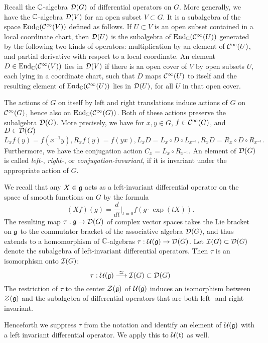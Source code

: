\documentclass{article}
\theoremstyle{definition}
\numberwithin{equation}{section}
\renewcommand{\-}{\hyp{}}
\newcommand{\g}{\mathfrak g}
\begin{document}
Recall the $\mathbb{C}$-algebra $\mathcal{D}(G)$ of differential operators on $G$. More generally, we have the $\mathbb{C}$-algebra $\mathcal{D}(V)$ for an open subset $V \subset G$. It is a subalgebra of the space $\textrm{End}_{\mathbb{C}}(\mathcal{C}^\infty(V))$ defined as follows. If $U \subset V$ is an open subset contained in a local coordinate chart, then $\mathcal{D}(U)$ is the subalgebra of $\textrm{End}_{\mathbb{C}}(\mathcal{C}^\infty(U))$ generated by the following two kinds of operators: multiplication by an element of $\mathcal{C}^\infty(U)$, and partial derivative with respect to a local coordinate. An element $D \in \textrm{End}_{\mathbb{C}}(\mathcal{C}^\infty(V))$ lies in $\mathcal{D}(V)$ if there is an open cover of $V$ by open subsets $U$, each lying in a coordinate chart, such that $D$ maps $\mathcal{C}^\infty(U)$ to itself and the resulting element of $\textrm{End}_{\mathbb{C}}(\mathcal{C}^\infty(U))$ lies in $\mathcal{D}(U)$, for all $U$ in that open cover. 

The actions of $G$ on itself by left and right translations induce actions of $G$ on $\mathcal{C}^\infty(G)$, hence also on $\textrm{End}_{\mathbb{C}}(\mathcal{C}^\infty(G))$. Both of these actions preserve the subalgebra $\mathcal{D}(G)$. More precisely, we have for $x,y \in G$, $f \in \mathcal{C}^\infty(G)$, and $D \in \mathcal{D}(G)$
\[ L_xf(y) = f(x^{-1}y), R_xf(y)=f(yx), L_xD = L_x \circ D \circ L_{x^{-1}}, R_xD = R_x \circ D \circ R_{x^{-1}}.\]
Furthermore, we have the conjugation action $C_x=L_x \circ R_{x^{-1}}$. An element of $\mathcal{D}(G)$ is called \emph{left-}, \emph{right-}, or \emph{conjugation-invariant}, if it is invariant under the appropriate action of $G$.

We recall that any $X \in \mathfrak{g}$ acts as a left-invariant differential operator on the space of smooth functions on $G$ by the formula
\[ (Xf)(g) = \frac{d}{dt}\Big|_{t=0}f(g \cdot \exp(tX)). \]
The resulting map $\tau : \mathfrak{g} \to \mathcal{D}(G)$ of complex vector spaces takes the Lie bracket on $\mathfrak{g}$ to the commutator bracket of the associative algebra $\mathcal{D}(G)$, and thus extends to a homomorphism of $\mathbb{C}$-algebras
$\tau : \mathcal{U}(\mathfrak{g}) \to \mathcal{D}(G)$.
Let $\mathcal{I}(G) \subset \mathcal{D}(G)$ denote the subalgebra of left-invariant differential operators. Then $\tau$ is an isomorphism onto $\mathcal{I}(G)$:
\[
\tau : \mathcal{U}(\mathfrak{g}) \overset\simeq\longrightarrow \mathcal{I}(G)\subset \mathcal{D}(G)
\]
The restriction of $\tau$ to the center $\mathcal{Z}(\mathfrak{g})$ of $\mathcal{U}(\mathfrak{g})$ induces an isomorphism between $\mathcal{Z}(\mathfrak{g})$ and the subalgebra of differential operators that are both left- and right-invariant.

Henceforth we suppress $\tau$ from the notation and identify an element of $\mc{U}(\g)$ with a left invariant differential operator.
We apply this to $\mathcal{U}(\mathfrak{t})$ as well.
\end{document}

